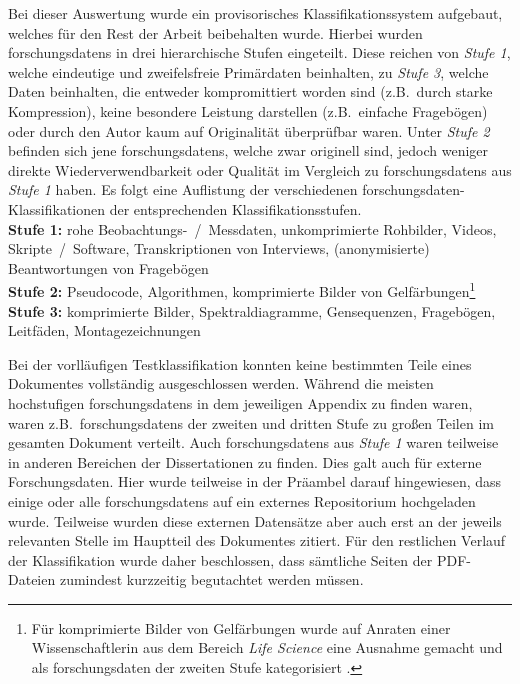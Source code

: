 Bei dieser Auswertung wurde ein provisorisches Klassifikationssystem aufgebaut, welches für den Rest der Arbeit beibehalten wurde.
Hierbei wurden \glspl{forschungsdaten} in drei hierarchische Stufen eingeteilt.
Diese reichen von \textit{Stufe 1}, welche eindeutige und zweifelsfreie Primärdaten beinhalten, zu \textit{Stufe 3}, welche Daten beinhalten, die entweder kompromittiert worden sind (z.B.~durch starke Kompression), keine besondere Leistung darstellen (z.B.~einfache Fragebögen) oder durch den Autor kaum auf Originalität überprüfbar waren.
Unter \textit{Stufe 2} befinden sich jene \glspl{forschungsdaten}, welche zwar originell sind, jedoch weniger direkte Wiederverwendbarkeit oder Qualität im Vergleich zu \glspl{forschungsdaten} aus \textit{Stufe 1} haben.
Es folgt eine Auflistung der verschiedenen \gls{forschungsdaten}-Klassifikationen der entsprechenden Klassifikationsstufen.\\
\textbf{Stufe 1:} rohe Beobachtungs-~/~Messdaten, unkomprimierte Rohbilder, Videos, Skripte~/~Software, Transkriptionen von Interviews, (anonymisierte) Beantwortungen von Fragebögen\\
\textbf{Stufe 2:} Pseudocode, Algorithmen, komprimierte Bilder von Gelfärbungen\footnote{Für komprimierte Bilder von Gelfärbungen wurde auf Anraten einer Wissenschaftlerin aus dem Bereich \textit{Life Science} eine Ausnahme gemacht und als \gls{forschungsdaten} der zweiten Stufe kategorisiert \autocite{SarahPC}.}\\
\textbf{Stufe 3:} komprimierte Bilder, Spektraldiagramme, Gensequenzen, Fragebögen, Leitfäden, Montagezeichnungen

Bei der vorlläufigen Testklassifikation konnten keine bestimmten Teile eines Dokumentes vollständig ausgeschlossen werden.
Während die meisten hochstufigen \glspl{forschungsdaten} in dem jeweiligen Appendix zu finden waren, waren z.B.~\glspl{forschungsdaten} der zweiten und dritten Stufe zu großen Teilen im gesamten Dokument verteilt.
Auch \glspl{forschungsdaten} aus \textit{Stufe 1} waren teilweise in anderen Bereichen der Dissertationen zu finden.
Dies galt auch für externe Forschungsdaten.
Hier wurde teilweise in der Präambel darauf hingewiesen, dass einige oder alle \glspl{forschungsdaten} auf ein externes Repositorium hochgeladen wurde.
Teilweise wurden diese externen Datensätze aber auch erst an der jeweils relevanten Stelle im Hauptteil des Dokumentes zitiert.
Für den restlichen Verlauf der Klassifikation wurde daher beschlossen, dass sämtliche Seiten der PDF-Dateien zumindest kurzzeitig begutachtet werden müssen.

